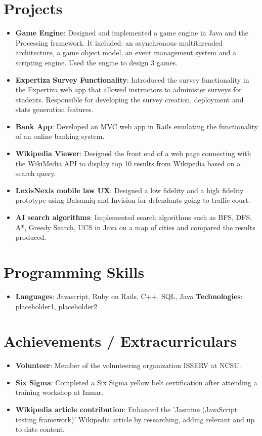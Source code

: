 \documentclass[letterpaper,11pt]{article}
\newcommand{\resumeItem}[2]{
  \item\small{
    \textbf{#1}{: #2 \vspace{-2pt}}
  }
}
\newcommand{\resumeSubItem}[2]{\resumeItem{#1}{#2}\vspace{-4pt}}
\newcommand{\resumeSubHeadingListStart}{\begin{itemize}[leftmargin=*]}
\newcommand{\resumeSubHeadingListEnd}{\end{itemize}}
\begin{document}
\section{Projects}
  \resumeSubHeadingListStart
    \resumeSubItem{Game Engine}
      {Designed and implemented a game engine in Java and the Processing framework. It included: an asynchronous multithreaded architecture, a game object model, an event management system and a scripting engine. Used the engine to design 3 games.}
    \resumeSubItem{Expertiza Survey Functionality}
      {Introduced the survey functionality in the Expertiza web app that allowed instructors to administer surveys for students. Responsible for developing the survey creation, deployment and stats generation features.}
    \resumeSubItem{Bank App}
      {Developed an MVC web app in Rails emulating the functionality of an online banking system.}
    \resumeSubItem{Wikipedia Viewer}
      {Designed the front end of a web page connecting with the WikiMedia API to display top 10 results from Wikipedia based on a search query.}
    \resumeSubItem{LexisNexis mobile law UX}
      {Designed a low fidelity and a high fidelity prototype using Balsamiq and Invision for defendants going to traffic court.}
    \resumeSubItem{AI search algorithms}
      {Implemented search algorithms such as BFS, DFS, A*, Greedy Search, UCS in Java on a map of cities and compared the results produced.}
  \resumeSubHeadingListEnd

%
\section{Programming Skills}
  \resumeSubHeadingListStart
    \item{
      \textbf{Languages}{: Javascript, Ruby on Rails, C++, SQL, Java}
      \hfill
      \textbf{Technologies}{: placeholder1, placeholder2}
    }
  \resumeSubHeadingListEnd


\section{Achievements / Extracurriculars}
  \resumeSubHeadingListStart
    \resumeSubItem{Volunteer}
      {Member of the volunteering organization ISSERV at NCSU.}
    \resumeSubItem{Six Sigma}
      {Completed a Six Sigma yellow belt certification after attending a training workshop at Inmar.}
    \resumeSubItem{Wikipedia article contribution}
      {Enhanced the 'Jasmine (JavaScript testing framework)' Wikipedia article by researching, adding relevant and up to date content.}
  \resumeSubHeadingListEnd


\end{document}
